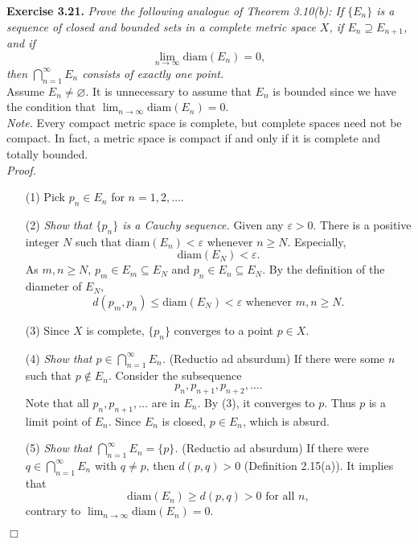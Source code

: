 \documentclass{article}
\begin{document}



\textbf{Exercise 3.21.}
\emph{Prove the following analogue of Theorem 3.10(b):
If $\{E_n\}$ is a sequence of closed and bounded sets in a complete metric space $X$,
if $E_n \supseteq E_{n+1}$, and if
$$\lim_{n \to \infty} \mathrm{diam}(E_n) = 0,$$
then $\bigcap_{n=1}^{\infty} E_n$ consists of exactly one point.} \\

Assume $E_n \neq \varnothing$. It is unnecessary to assume that $E_n$ is bounded
since we have the condition that $\lim_{n \to \infty} \mathrm{diam}(E_n) = 0$.\\

\emph{Note.}
Every compact metric space is complete, but complete spaces need not be compact.
In fact, a metric space is compact if and only if it is complete and totally bounded. \\

\emph{Proof.}
\begin{enumerate}
\item[(1)]
Pick $p_n \in E_n$ for $n = 1, 2, \ldots$.
\item[(2)]
\emph{Show that $\{p_n\}$ is a Cauchy sequence.}
Given any $\varepsilon > 0$.
There is a positive integer $N$ such that
$\mathrm{diam}(E_n) < \varepsilon$ whenever $n \geq N$.
Especially, $$\mathrm{diam}(E_N) < \varepsilon.$$
As $m, n \geq N$, $p_m \in E_m \subseteq E_N$ and $p_n \in E_n \subseteq E_N$.
By the definition of the diameter of $E_N$,
$$d(p_m,p_n) \leq \mathrm{diam}(E_N) < \varepsilon \text{ whenever } m,n \geq N.$$
\item[(3)]
Since $X$ is complete, $\{p_n\}$ converges to a point $p \in X$.
\item[(4)]
\emph{Show that $p \in \bigcap_{n=1}^{\infty} E_n$.}
(Reductio ad absurdum)
If there were some $n$ such that $p \not\in E_{n}$.
Consider the subsequence
$$p_{n}, p_{n+1}, p_{n+2}, \ldots.$$
Note that all $p_{n}, p_{n+1}, \ldots$ are in $E_n$.
By (3), it converges to $p$. Thus $p$ is a limit point of $E_n$.
Since $E_n$ is closed, $p \in E_n$, which is absurd.
\item[(5)]
\emph{Show that $\bigcap_{n=1}^{\infty} E_n = \{p\}$.}
(Reductio ad absurdum)
If there were $q \in \bigcap_{n=1}^{\infty} E_n$ with $q \neq p$,
then $d(p,q) > 0$ (Definition 2.15(a)).
It implies that
$$\mathrm{diam}(E_n)
\geq d(p,q) > 0 \text{ for all } n,$$
contrary to $\lim_{n \to \infty} \mathrm{diam}(E_n) = 0$.
\end{enumerate}
$\Box$ \\\\
\end{document}
